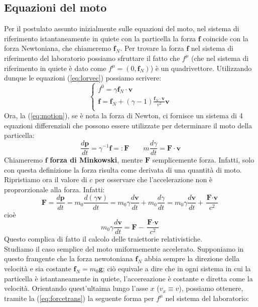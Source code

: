 \documentclass[a4paper,11pt]{book}
\theoremstyle{plain}
\theoremstyle{definition}
\begin{document}
\subsection{Equazioni del moto}
Per il postulato assunto inizialmente sulle equazioni del moto, nel sistema di riferimento istantaneamente in quiete con la particella la forza $\textbf{f}$ coincide con la forza Newtoniana, che chiameremo $\textbf{f}_N$. Per trovare la forza $\textbf{f}$ nel sistema di riferimento del laboratorio possiamo sfruttare il fatto che $f^{\mu}$ (che nel sistema di riferimento in quiete è dato come $f^{\mu}=(0,\textbf{f}_N)$) è un quadrivettore. Utilizzando dunque le equazioni (\ref{eq:lorvec}) possiamo scrivere:
\begin{equation}\label{eq:forcetrans}
\begin{cases}
f^0 = \gamma \textbf{f}_{N}\cdot \textbf{v} \\
\textbf{f} = \textbf{f}_N+(\gamma-1)\frac{\textbf{f}_N\cdot\textbf{v}}{v^2}\textbf{v}\\
\end{cases}
\end{equation}
Ora, la (\ref{eq:motion}), se è nota la forza di Newton, ci fornisce un sistema di 4 equazioni differenziali che possono essere utilizzate per determinare il moto della particella:
\[
\frac{d\textbf{p}}{dt}=\gamma^{-1}\textbf{f} =: \textbf{F} \qquad m\frac{d\gamma}{dt}=\textbf{F}\cdot\textbf{v}
\]
Chiameremo $\textbf{f}$ \textbf{forza di Minkowski}, mentre $\textbf{F}$ semplicemente forza. Infatti, solo con questa definizione la forza risulta come derivata di una quantità di moto. Ripristiamo ora il valore di $c$ per osservare che l'accelerazione non è proprorzionale alla forza. Infatti:
\[
\textbf{F}=\frac{d\textbf{p}}{dt} = m_0\frac{d(\gamma\textbf{v})}{dt}=m_0\gamma\frac{d\textbf{v}}{dt}+m_0\frac{d\gamma}{dt}=m_0\gamma\frac{d\textbf{v}}{dt}+\frac{\textbf{F}\cdot\textbf{v}}{c^2}
\]
cioè
\begin{equation}
m_0\gamma\frac{d\textbf{v}}{dt}=\textbf{F}-\frac{\textbf{F}\cdot \textbf{v}}{c^2}
\end{equation}
Questo complica di fatto il calcolo delle traiettorie relativistiche. \\
Studiamo il caso semplice del moto uniformemente accelerato. Supponiamo in questo frangente che la forza newotoniana $\textbf{f}_N$ abbia sempre la direzione della velocità e sia costante $\textbf{f}_N=m_0\textbf{g}$; ciò equivale a dire che in ogni sistema in cui la particella è istantaneamente in quiete, l'accereazione è costante e diretta come la velocità. Orientando quest'ultaima lungo l'asse $x$ ($v_x\equiv v$), possiamo ottenere, tramite la (\ref{eq:forcetrans}) la seguente forma per $f^{\mu}$ nel sistema del laboratorio:
\end{document}
